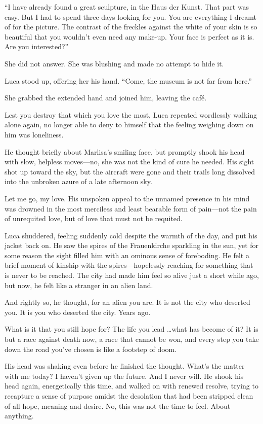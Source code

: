 ``I have already found a great sculpture, in the Haus der Kunst. That part was easy. But I had to spend three days looking for you. You are everything I dreamt of for the picture. The contrast of the freckles against the white of your skin is so beautiful that you wouldn't even need any make-up. Your face is perfect as it is. Are you interested?''

She did not answer. She was blushing and made no attempt to hide it.

Luca stood up, offering her his hand. ``Come, the museum is not far from here.''

She grabbed the extended hand and joined him, leaving the café.

\sectionline

Lest you destroy that which you love the most, Luca repeated wordlessly walking alone again, no longer able to deny to himself that the feeling weighing down on him was loneliness.

He thought briefly about Marlisa's smiling face, but promptly shook his head with slow, helpless moves---no, she was not the kind of cure he needed. His sight shot up toward the sky, but the aircraft were gone and their trails long dissolved into the unbroken azure of a late afternoon sky.

Let me go, my love. His unspoken appeal to the unnamed presence in his mind was drowned in the most merciless and least bearable form of pain---not the pain of unrequited love, but of love that must not be requited.

Luca shuddered, feeling suddenly cold despite the warmth of the day, and put his jacket back on. He saw the spires of the Frauenkirche sparkling in the sun, yet for some reason the sight filled him with an ominous sense of foreboding. He felt a brief moment of kinship with the spires---hopelessly reaching for something that is never to be reached. The city had made him feel so alive just a short while ago, but now, he felt like a stranger in an alien land.

And rightly so, he thought, for an alien you are. It is not the city who deserted you. It is you who deserted the city. Years ago.

What is it that you still hope for? The life you lead \ldots what has become of it? It is but a race against death now, a race that cannot be won, and every step you take down the road you've chosen is like a footstep of doom.

His head was shaking even before he finished the thought. What's the matter with me today? I haven't given up the future. And I never will. He shook his head again, energetically this time, and walked on with renewed resolve, trying to recapture a sense of purpose amidst the desolation that had been stripped clean of all hope, meaning and desire. No, this was not the time to feel. About anything.

